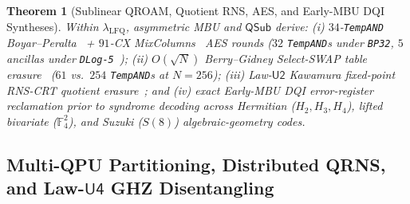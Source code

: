 \documentclass[acmsmall,screen,anonymous]{acmart}
\DeclareRobustCommand{\_}{\ifmmode\text{\char95}\else\char95\penalty0\relax\fi}
\theoremstyle{plain}
\newtheorem{theorem}{Theorem}[section]
\newcommand{\QSub}{\ensuremath{\mathsf{QSub}}}
\begin{document}
\begin{theorem}[Sublinear QROAM, Quotient RNS, AES, and Early-MBU DQI Syntheses]
\label{thm:t5}
Within $\lambda_{\mathrm{LFQ}}$, asymmetric MBU and $\QSub$ derive: (i) $34$-\texttt{TempAND} Boyar--Peralta~\cite{boyar2012} + $91$-CX MixColumns~\cite{xiang2020} AES rounds ($32$ \texttt{TempAND}s under \texttt{BP32}, $5$ ancillas under \texttt{DLog-5}~\cite{lin2025aes}); (ii) $O(\sqrt{N})$ Berry--Gidney Select-SWAP table erasure~\cite{berry2019} ($61$ vs.\ $254$ \texttt{TempAND}s at $N=256$); (iii) Law-$\mathsf{U2}$ Kawamura fixed-point RNS-CRT quotient erasure~\cite{kawamura2000}; and (iv) exact Early-MBU DQI error-register reclamation prior to syndrome decoding across Hermitian ($H_2, H_3, H_4$), lifted bivariate ($\mathbb{F}_4^2$), and Suzuki ($S(8)$) algebraic-geometry codes.
\end{theorem}

\subsection{Multi-QPU Partitioning, Distributed QRNS, and Law-$\mathsf{U4}$ GHZ Disentangling}
\label{sec:cluster}
\end{document}
